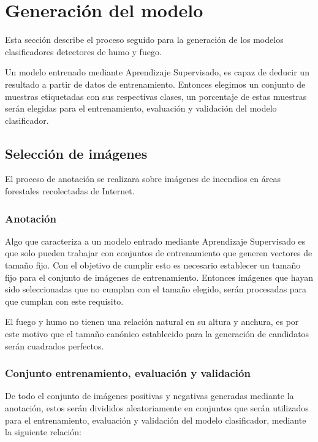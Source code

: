 \section{Generación del modelo}

\noindent Esta sección describe el proceso seguido para la generación de los modelos clasificadores detectores de humo y fuego.

\noindent Un modelo entrenado mediante Aprendizaje Supervisado, es capaz de deducir un resultado a partir de datos de entrenamiento. Entonces elegimos un conjunto de muestras etiquetadas con sus respectivas clases, un porcentaje de estas muestras serán elegidas para el entrenamiento, evaluación y validación del modelo clasificador.

\subsection{Selección de imágenes}

\noindent El proceso de anotación se realizara sobre imágenes de incendios en áreas forestales recolectadas de Internet.

\subsubsection{Anotación}
\noindent Algo que caracteriza a un modelo entrado mediante Aprendizaje Supervisado es que solo pueden trabajar con conjuntos de entrenamiento que generen vectores de tamaño fijo. Con el objetivo de cumplir esto es necesario establecer un tamaño fijo para el conjunto de imágenes de entrenamiento. Entonces imágenes que hayan sido seleccionadas que no cumplan con el tamaño elegido, serán procesadas para que cumplan con este requisito.

\noindent El fuego y humo no tienen una relación natural en su altura y anchura, es por este motivo que el tamaño canónico establecido para la generación de candidatos serán cuadrados perfectos.

\subsubsection{Conjunto entrenamiento, evaluación y validación}

\noindent De todo el conjunto de imágenes positivas y negativas generadas mediante la anotación, estos serán divididos aleatoriamente en conjuntos que serán utilizados para el entrenamiento, evaluación y validación del modelo clasificador, mediante la siguiente relación:

